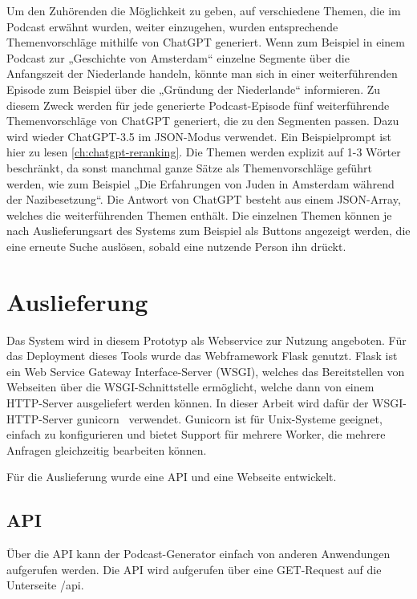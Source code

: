 Um den Zuhörenden die Möglichkeit zu geben, auf verschiedene Themen, die im Podcast erwähnt wurden, weiter einzugehen, wurden entsprechende Themenvorschläge mithilfe von ChatGPT generiert.
Wenn zum Beispiel in einem Podcast zur „Geschichte von Amsterdam“ einzelne Segmente über die Anfangszeit der Niederlande handeln, könnte man sich in einer weiterführenden Episode zum Beispiel über die „Gründung der Niederlande“ informieren.
Zu diesem Zweck werden für jede generierte Podcast-Episode fünf weiterführende Themenvorschläge von ChatGPT generiert, die zu den Segmenten passen.
Dazu wird wieder ChatGPT-3.5 im JSON-Modus verwendet.
Ein Beispielprompt ist hier zu lesen \autoref{ch:chatgpt-reranking}.
Die Themen werden explizit auf 1-3 Wörter beschränkt, da sonst manchmal ganze Sätze als Themenvorschläge geführt werden, wie zum Beispiel „Die Erfahrungen von Juden in Amsterdam während der Nazibesetzung“.
Die Antwort von ChatGPT besteht aus einem JSON-Array, welches die weiterführenden Themen enthält.
Die einzelnen Themen können je nach Auslieferungsart des Systems zum Beispiel als Buttons angezeigt werden, die eine erneute Suche auslösen, sobald eine nutzende Person ihn drückt.

\section{Auslieferung}

Das System wird in diesem Prototyp als Webservice zur Nutzung angeboten.
Für das Deployment dieses Tools wurde das Webframework Flask genutzt.
Flask ist ein Web Service Gateway Interface-Server (WSGI), welches das Bereitstellen von Webseiten über die WSGI-Schnittstelle ermöglicht, welche dann von einem HTTP-Server ausgeliefert werden können.
In dieser Arbeit wird dafür der WSGI-HTTP-Server gunicorn~\cite{zotero-569} verwendet.
Gunicorn ist für Unix-Systeme geeignet, einfach zu konfigurieren und bietet Support für mehrere Worker, die mehrere Anfragen gleichzeitig bearbeiten können.

Für die Auslieferung wurde eine API und eine Webseite entwickelt.

\subsection{API}

Über die API kann der Podcast-Generator einfach von anderen Anwendungen aufgerufen werden.
Die API wird aufgerufen über eine GET-Request auf die Unterseite /api.

